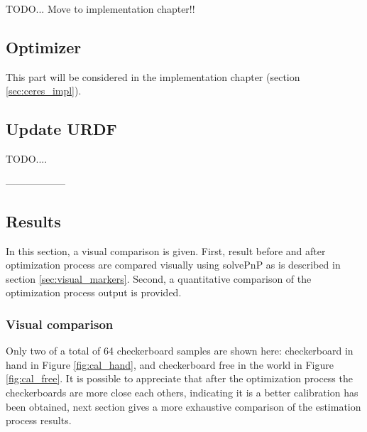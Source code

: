 TODO... Move to implementation chapter!!



\subsection{Optimizer}

This part will be considered in the implementation chapter (section \ref{sec:ceres_impl}).


\subsection{Update URDF}

TODO....



------------------


\subsection{Results}
\label{sec:results}

In this section, a visual comparison is given. First, result before and after optimization process are compared visually using solvePnP as is described in section \ref{sec:visual_markers}. Second, a quantitative comparison of the optimization process output is provided.

\subsubsection{Visual comparison}

Only two of a total of 64 checkerboard samples are shown here: checkerboard in hand in Figure \ref{fig:cal_hand}, and checkerboard free in the world in Figure \ref{fig:cal_free}. It is possible to appreciate that after the optimization process the checkerboards are more close each others, indicating it is a better calibration has been obtained, next section gives a more exhaustive comparison of the estimation process results.
%

